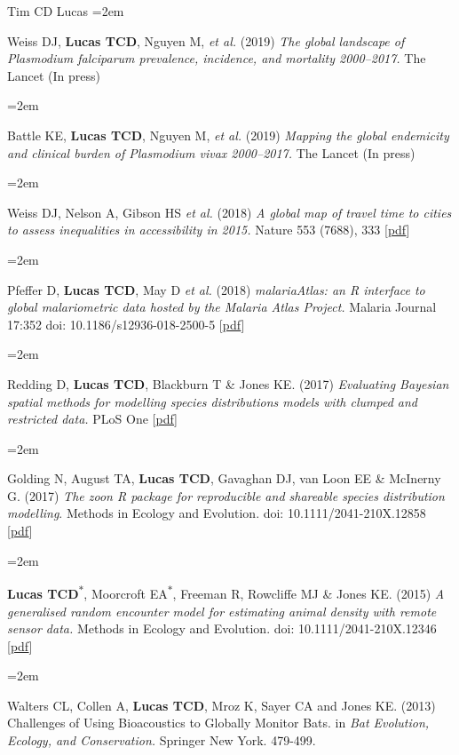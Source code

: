 \documentclass{scrartcl}
\newcommand{\MarginText}[1]{\marginpar{\raggedleft\itshape\small#1}} %
\newcommand{\Description}[1]{\hangindent=2em\hangafter=0\noindent\raggedright\footnotesize{#1}\par\normalsize\vspace{1em}} %
\begin{document}
\begin{cv}{Tim {\Large CD} Lucas}
\Description{\MarginText{2019}Weiss DJ, \textbf{Lucas TCD}, Nguyen M, \emph{et al.} (2019) \emph{The global landscape of Plasmodium falciparum prevalence, incidence, and mortality 2000--2017.} The Lancet (In press)}

\Description{Battle KE, \textbf{Lucas TCD},  Nguyen M, \emph{et al.} (2019) \emph{Mapping the global endemicity and clinical burden of Plasmodium vivax 2000--2017.} The Lancet (In press)}

\Description{\MarginText{2018}Weiss DJ, Nelson A, Gibson HS \emph{et al.} (2018) \emph{A global map of travel time to cities to assess inequalities in accessibility in 2015.} Nature 553 (7688), 333 [\href{https://www.nature.com/articles/nature25181.pdf}{pdf}]}

\Description{Pfeffer D, \textbf{Lucas TCD}, May D \emph{et al.} (2018) \emph{malariaAtlas: an R interface to global malariometric data hosted by the Malaria Atlas Project.} Malaria Journal 17:352 doi: 10.1186/s12936-018-2500-5 [\href{https://malariajournal.biomedcentral.com/track/pdf/10.1186/s12936-018-2500-5}{pdf}]}


\Description{\MarginText{2017}Redding D, \textbf{Lucas TCD}, Blackburn T \& Jones KE. (2017) \emph{Evaluating Bayesian spatial methods for modelling species distributions models with clumped and restricted data.} PLoS One [\href{https://journals.plos.org/plosone/article/file?id=10.1371/journal.pone.0187602&type=printable}{pdf}]}

\Description{Golding N, August TA, \textbf{Lucas TCD}, Gavaghan DJ, van Loon EE \& McInerny G. (2017) \emph{The zoon R package for reproducible and shareable species distribution modelling}. Methods in Ecology and Evolution. doi: 10.1111/2041-210X.12858 [\href{http://onlinelibrary.wiley.com/doi/10.1111/2041-210X.12858/pdf}{pdf}]}

\Description{\MarginText{2015}\textbf{Lucas TCD}\textsuperscript{$\ast$}, Moorcroft EA\textsuperscript{$\ast$}, Freeman R, Rowcliffe MJ \& Jones KE. (2015) \emph{A generalised random encounter model for estimating animal density with remote sensor data.} Methods in Ecology and Evolution. doi: 10.1111/2041-210X.12346 [\href{http://onlinelibrary.wiley.com/doi/10.1111/2041-210X.12346/epdf}{pdf}]}

\Description{\MarginText{2013}Walters CL, Collen A, \textbf{Lucas TCD}, Mroz K, Sayer CA and Jones KE. (2013) Challenges of Using Bioacoustics to Globally Monitor Bats. in \emph{Bat Evolution, Ecology, and Conservation.} Springer New York. 479-499.}


\end{cv}
\end{document}
